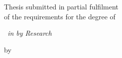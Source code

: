 \thispagestyle{empty}
\begin{center}
\vspace*{1.5cm}
{\Large \bf \thesistitle}

\vspace*{3.75cm}
{\large Thesis submitted in partial fulfilment \\}
{\large  of the requirements for the degree of \\}

\vspace*{1cm}
{\it {\large \thesisdegree \ in \textbf{\thesisdepartment} by Research}}

\vspace*{1cm}
{\large by}

\vspace*{5mm}
{\large \thesisauthor \\}
{\large \rollnumber \\
{\small \tt \email}}


\vspace*{4.0cm}
{\\}
{\large \universityname \\}
{\large \universityaddress \\}
{\large \thesissubmissionmonth \ \thesissubmissionyear \\}
\end{center}
